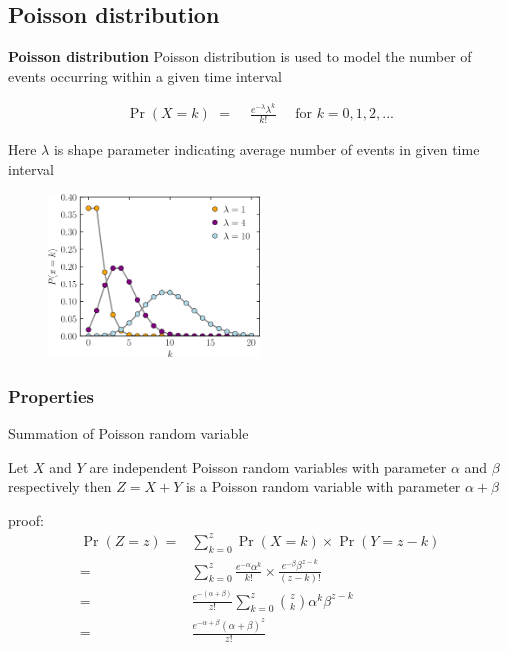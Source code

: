 \documentclass{beamer}
\providecommand{\pr}[1]{\ensuremath{\Pr\left(#1\right)}}
\providecommand{\brak}[1]{\ensuremath{\left(#1\right)}}
\begin{document}
\subsection{Poisson distribution}
\begin{frame}{\textbf{Poisson distribution}}
    Poisson distribution is used to model the number of events occurring within a given time interval
    \begin{block}{}
    \begin{align}
        \pr{X=k}\,\,=&\,\,\frac{e^{-\lambda} \lambda^k}{k!}  \quad \text{ for } k = 0,1,2,...
    \end{align}
    \end{block}
    Here $\lambda$ is shape parameter indicating average number of events in given time interval
    \begin{figure}
        \centering
        \includegraphics[width=0.5\textwidth,height=0.3\textwidth]{figures/poisson.png}
        \label{fig:my_label}
    \end{figure}
\end{frame}

\subsubsection{Properties}
\begin{frame}{Summation of Poisson random variable}
    \begin{block}{}
       Let $X$ and $Y$ are independent Poisson random variables with parameter $\alpha$ and $\beta$ respectively then $Z=X+Y$ is a Poisson random variable with parameter $\alpha+\beta$
    \end{block}
    \begin{block}{proof:}
    {\small
        \begin{align}
            \pr{Z=z}=&\sum_{k=0}^{z} \pr{X=k}\times \pr{Y=z-k}
            \\=&\sum_{k=0}^{z}\frac{e^{-\alpha} \alpha^k}{k!}\times \frac{e^{-\beta} \beta^{z-k}}{\brak{z-k}!} 
            \\=& \frac{e^{-\brak{\alpha +\beta}}}{z!} \sum_{k=0}^{z}\binom{z}{k}\alpha^k \beta^{z-k}
            \\=&\frac{e^{-\alpha + \beta} \brak{\alpha + \beta}^z}{z!} 
        \end{align}
    }%
    \end{block}
\label{addative_property}
\end{frame}
\end{document}
